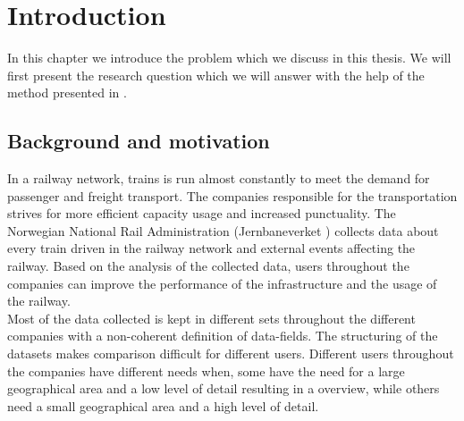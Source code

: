 
\chapter{Introduction}
\label{chapter:introduction}


In this chapter we introduce the problem which we discuss in this thesis.
We will first present the research question which we will answer with the help
of the method presented in  .

\section{Background and motivation} %
\label{sec:background_and_motivation}
In a railway network, trains is run almost constantly to meet the demand for 
passenger and freight transport. The companies responsible for the 
transportation strives for more efficient capacity usage and increased 
punctuality. The Norwegian National Rail Administration (Jernbaneverket 
\cite{jernbaneverketAbout}) collects data about every train driven in the 
railway network and external events affecting the railway. 
Based on the analysis of the collected data, users throughout the companies 
can improve the performance of the infrastructure and the usage of the 
railway.\\

Most of the data collected is kept in different sets throughout the different
companies with a non-coherent definition of data-fields. The structuring of 
the datasets makes comparison difficult for different users. Different users
throughout the companies have different needs when, some have
the need for a large geographical area and a low level of detail resulting in a
overview, while others need a small geographical area and a high level of 
detail. \\


